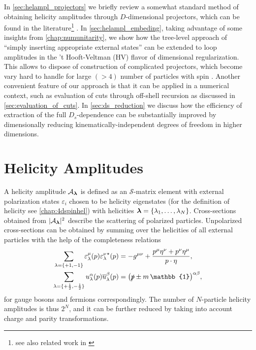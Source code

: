 In \cref{sec:helampl_projectors} we briefly review a somewhat standard 
method of obtaining helicity amplitudes through $D$-dimensional projectors,
which can be found in the literature\footnote{
  see also related work in \cite{Chen:2019wyb,Boels:2018nrr} 
} \cite{Garland:2002ak, Moch:2002hm, Glover:2003cm, Glover:2004si,Gehrmann:2009vu,Gehrmann:2011aa}.
In \cref{sec:helampl_embeding}, 
taking advantage of some insights from \cref{chap:numunitarity},
we show how the tree-level approach of ``simply inserting appropriate external states'' can
be extended to loop amplitudes in the 't Hooft-Veltman (HV) flavor of dimensional regularization.
This allows to dispose of construction of complicated projectors, which
become vary hard to handle for large $(> 4)$ number of particles with spin \cite{Peraro:2019cjj}. 
Another convenient feature of our approach is that it can be applied in a numerical context, such
as evaluation of cuts through off-shell recursion as discussed in \cref{sec:evaluation_of_cuts}.
In \cref{sec:ds_reduction} we discuss how
the efficiency of extraction of the full $D_s$-dependence can be substantially improved
by dimensionally reducing kinematically-independent degrees of freedom in higher dimensions.

\section{Helicity Amplitudes}
\label{sec:HV_helicity_amplitudes}

A helicity amplitude $\mathcal{A}_{\vb*{\lambda}}$
is defined as an $\mathcal{S}$-matrix element
with external polarization states $\varepsilon_{i}$ chosen to be
helicity eigenstates (for the definition of helicity see \cref{chap:4dspinhel}) with helicities $\vb*{\lambda}=\{\lambda_1,\ldots{},\lambda_N\}$.
Cross-sections obtained from $\vert \mathcal{A}_{\vb*{\lambda}}{} \vert^2$ describe
the scattering of polarized particles.
Unpolarized cross-sections can be obtained by summing over the helicities of all external particles
with the help of the completeness relations
\begin{subequations}
  \label{eq:4d_completeness_relations}
  \begin{align}
    \sum_{\lambda=\{+1,-1\}} \varepsilon^\mu_\lambda(p){\varepsilon^\nu_\lambda}^{\star{}}(p)  &= -g^{\mu\nu} + \frac{p^\mu \eta^\nu + p^\nu \eta^\mu}{\sp(p,\eta)}, \\
    \sum_{\lambda=\{+\frac{1}{2},-\frac{1}{2}\}} u^\alpha_\lambda(p){\overline{u}_\lambda^\beta}(p)  &= \qty(\slashed{p}  \pm m\,\mathbb{1})^{\alpha\beta},
  \end{align}
\end{subequations}
for gauge bosons and fermions correspondingly.
The number of $N$-particle helicity amplitudes is thus $2^N$, and
it can be further reduced by taking into account charge and parity transformations.

